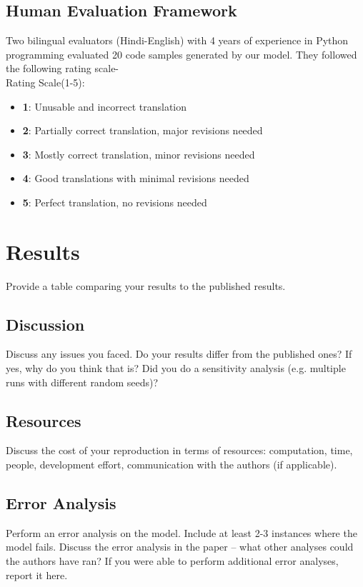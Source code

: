 \documentclass[11pt,a4paper]{article}
\begin{document}
\subsection{Human Evaluation Framework}
Two bilingual evaluators (Hindi-English) with 4 years of experience in Python programming evaluated 20 code samples generated by our model. They followed the following rating scale-\\ 
Rating Scale(1-5):
\begin{itemize}[itemsep=0pt, topsep=0pt]
    \item \textbf{1}: Unusable and incorrect translation
    \item \textbf{2}: Partially correct translation, major revisions needed
    \item \textbf{3}: Mostly correct translation, minor revisions needed
    \item \textbf{4}: Good translations with minimal revisions needed
    \item \textbf{5}: Perfect translation, no revisions needed
\end{itemize}

\section{Results}
Provide a table comparing your results to the published results.

\subsection{Discussion}
Discuss any issues you faced. Do your results differ from the published ones? If yes, why do you think that is? Did you do a sensitivity analysis (e.g. multiple runs with different random seeds)?

\subsection{Resources}
Discuss the cost of your reproduction in terms of resources: computation, time, people, development effort, communication with the authors (if applicable).


\subsection{Error Analysis}
Perform an error analysis on the model. Include at least 2-3 instances where the model fails. Discuss the error analysis in the paper -- what other analyses could the authors have ran? If you were able to perform additional error analyses, report it here.
\end{document}
